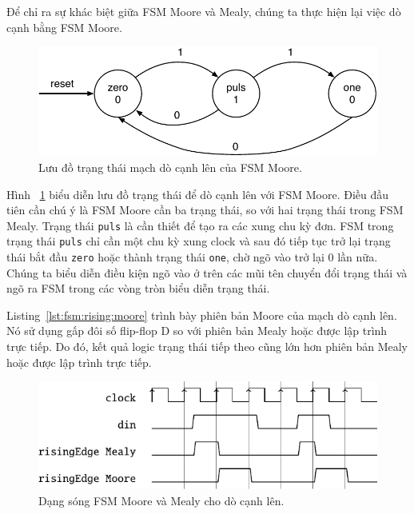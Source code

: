 \documentclass[%
    10pt,
    headinclude, footexclude,
    openright, %
    notitlepage,
    cleardoubleempty,
    headsepline,
    pointlessnumbers,
    bibtotoc, idxtotoc,
    ]{scrbook}
\newcommand{\code}[1]{{\small{\texttt{#1}}}}
\newcommand{\scale}{0.7}
\begin{document}
Để chỉ ra sự khác biệt giữa FSM Moore và Mealy, chúng ta thực hiện lại việc dò cạnh bằng FSM Moore. 

\begin{figure}
  \centering
  \includegraphics[scale=\scale]{figures/state-diag-rising-moore}
  \caption{Lưu đồ trạng thái mạch dò cạnh lên của FSM Moore.}
  \label{fig:diag:rising:moore}
\end{figure}

Hình ~\ref{fig:diag:rising:moore} biểu diễn lưu đồ trạng thái để dò cạnh lên với FSM Moore. Điều đầu tiên cần chú ý là FSM Moore cần ba trạng thái, so với hai trạng thái trong FSM Mealy. Trạng thái \code{puls} là cần thiết để tạo ra các xung chu kỳ đơn. FSM trong trạng thái \code{puls} chỉ cần một chu kỳ xung clock và sau đó tiếp tục trở lại trạng thái bắt đầu \code{zero} hoặc thành trạng thái \code{one}, chờ ngõ vào trở lại 0 lần nữa. Chúng ta biểu diễn điều kiện ngõ vào ở trên các mũi tên chuyển đổi trạng thái và ngõ ra FSM trong các vòng tròn biểu diễn trạng thái. 


Listing~\ref{lst:fsm:rising:moore} trình bày phiên bản Moore của mạch dò cạnh lên. Nó sử dụng gấp đôi số flip-flop D so với phiên bản Mealy hoặc được lập trình trực tiếp. Do đó, kết quả logic trạng thái tiếp theo cũng lớn hơn phiên bản Mealy hoặc được lập trình trực tiếp. 

\begin{figure}
  \centering
  \includegraphics[scale=1]{figures/rising}
  \caption{Dạng sóng FSM Moore và Mealy cho dò cạnh lên.}
  \label{fig:rising}
\end{figure}
\end{document}

